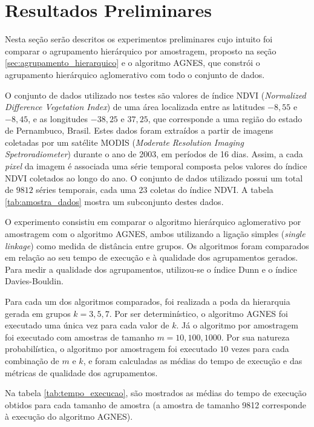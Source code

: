 \section{Resultados Preliminares}
	\label{sec:resultados_preliminares}

Nesta seção serão descritos os experimentos preliminares cujo intuito foi comparar
o agrupamento hierárquico por amostragem, proposto na seção
\ref{sec:agrupamento_hierarquico} e o algoritmo AGNES, que constrói o
agrupamento hierárquico aglomerativo com todo o conjunto de dados.

O conjunto de dados utilizado nos testes são valores de índice NDVI
(\emph{Normalized Difference Vegetation Index}) de uma área localizada entre
as latitudes $-8,55$ e $-8,45$, e as longitudes $-38,25$ e $37,25$, que 
corresponde a uma região do estado de Pernambuco, Brasil. Estes dados foram
extraídos a partir de imagens coletadas por um satélite MODIS
(\emph{Moderate Resolution Imaging Spetroradiometer}) durante o ano de 2003,
em períodos de 16 dias. Assim, a cada \emph{pixel} da imagem é associada uma
série temporal composta pelos valores do índice NDVI coletados ao longo do ano.
O conjunto de dados utilizado possui um total de $9812$ séries temporais, cada
uma $23$ coletas do índice NDVI. A tabela \ref{tab:amostra_dados} mostra um
subconjunto destes dados.



O experimento consistiu em comparar o algoritmo hierárquico aglomerativo por
amostragem com o algoritmo AGNES, ambos utilizando a ligação simples
(\emph{single linkage}) como medida de distância entre grupos. Os algoritmos
foram comparados em relação ao seu tempo de execução e à qualidade dos
agrupamentos gerados. Para medir a qualidade dos agrupamentos, utilizou-se
o índice Dunn e o índice Davies-Bouldin.

Para cada um dos algoritmos comparados, foi realizada a poda da hierarquia
gerada em grupos $k = 3,5,7$. Por ser determinístico, o algoritmo AGNES foi
executado uma única vez para cada valor de $k$. Já o algoritmo por amostragem
foi executado com amostras de tamanho $m = 10,100,1000$. Por sua natureza 
probabilística, o algoritmo por amostragem foi executado $10$ vezes para cada
combinação de $m$ e $k$, e foram calculadas as médias do tempo de execução
e das métricas de qualidade dos agrupamentos. 

Na tabela \ref{tab:tempo_execucao}, são mostrados as médias do tempo de execução
obtidos para cada tamanho de amostra (a amostra de tamanho 9812 corresponde
à execução do algoritmo AGNES).

